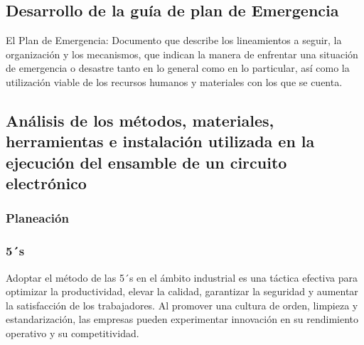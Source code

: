     \subsection{Desarrollo de la guía de plan de Emergencia}
    El Plan de Emergencia: Documento que describe los lineamientos a seguir, la organización y los mecanismos, que indican la manera de enfrentar una situación de emergencia o desastre tanto en lo general como en lo particular, así como la utilización viable de los recursos humanos y materiales con los que se cuenta.
    
    
  

    \begin{figure}[H]
    
    \end{figure}

\subsection{Análisis de los métodos, materiales, herramientas e instalación utilizada en la ejecución del ensamble de un circuito electrónico}
\subsubsection{Planeación}

\subsubsection{5´s}
Adoptar el método de las 5´s en el ámbito industrial es una táctica efectiva para optimizar la productividad, elevar la calidad, garantizar la seguridad y aumentar la satisfacción de los trabajadores. Al promover una cultura de orden, limpieza y estandarización, las empresas pueden experimentar innovación en su rendimiento operativo y su competitividad.

